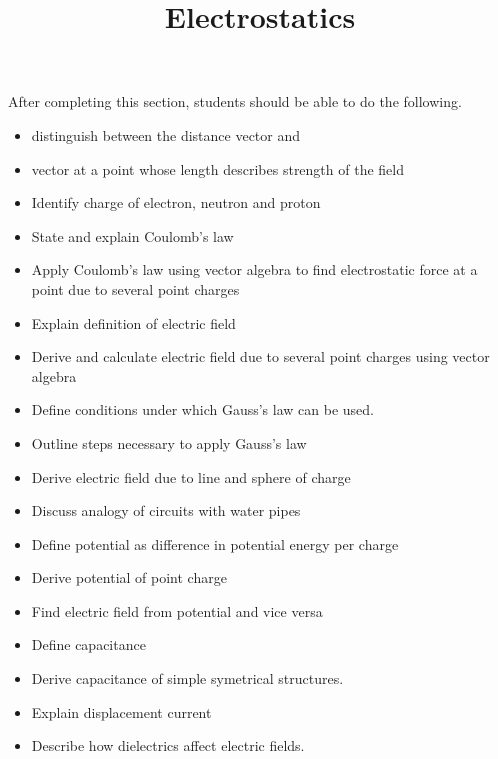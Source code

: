 \documentclass{ximera}
\title{Electrostatics}
\begin{document}
\begin{abstract}
\end{abstract}

\maketitle

\begin{sectionOutcomes}

After completing this section, students should be able to do the following.

\begin{itemize}
\item distinguish between the distance vector and 
\item vector at a point whose length describes strength of the field
\item Identify charge of electron, neutron and proton 
\item State and explain Coulomb’s law
\item Apply Coulomb’s law using vector algebra to find electrostatic force at a point due to several point charges
\item Explain definition of electric field
\item Derive and calculate electric field due to several point charges using vector algebra 
\item Define conditions under which Gauss’s law can be used.
\item Outline steps necessary to apply Gauss’s law
\item Derive electric field due to line and sphere of charge
\item Discuss analogy of circuits with water pipes
\item Define potential as difference in potential energy per charge
\item  Derive potential of point charge
\item Find electric field from potential and vice versa
\item Define capacitance
\item Derive capacitance of simple symetrical structures.
\item Explain displacement current
\item Describe how  dielectrics affect electric fields.
\end{itemize}

\end{sectionOutcomes}
\end{document}
